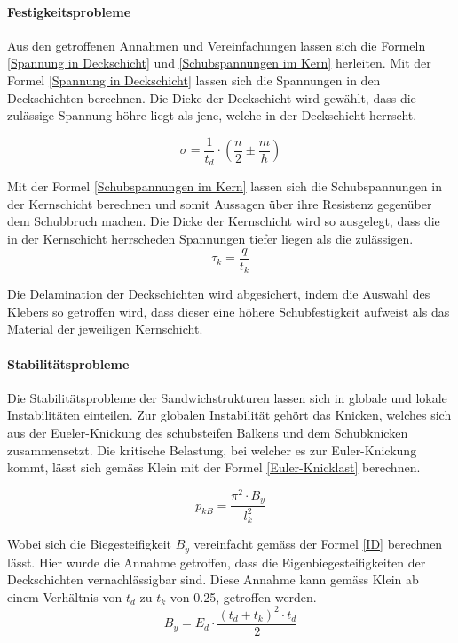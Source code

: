     \paragraph{Festigkeitsprobleme}
    Aus den getroffenen Annahmen und Vereinfachungen lassen sich die Formeln \ref{Spannung in Deckschicht} und \ref{Schubspannungen im Kern} herleiten. Mit der Formel \ref{Spannung in Deckschicht} lassen sich die Spannungen in den Deckschichten berechnen. Die Dicke der Deckschicht wird gewählt, dass die zulässige Spannung höhre liegt als jene, welche in der Deckschicht herrscht.

    \begin{equation}
      \label{Spannung in Deckschicht}
      \sigma = \frac{1}{t_d}\cdot \left ( \frac{n}{2} \pm \frac{m}{h}\right )
    \end{equation}

    Mit der Formel \ref{Schubspannungen im Kern} lassen sich die Schubspannungen in der Kernschicht berechnen und somit Aussagen über ihre Resistenz gegenüber dem Schubbruch machen. Die Dicke der Kernschicht wird so ausgelegt, dass die in der Kernschicht herrscheden Spannungen tiefer liegen als die zulässigen.
    \begin{equation}
      \label{Schubspannungen im Kern}
      \tau_k = \frac{q}{t_k}
    \end{equation}

    Die Delamination der Deckschichten wird abgesichert, indem die Auswahl des Klebers so getroffen wird, dass dieser eine höhere Schubfestigkeit aufweist als das Material der jeweiligen Kernschicht.

    \paragraph{Stabilitätsprobleme}
    Die Stabilitätsprobleme der Sandwichstrukturen lassen sich in globale und lokale Instabilitäten einteilen. Zur globalen Instabilität gehört das Knicken, welches sich aus der Eueler-Knickung des schubsteifen Balkens und dem Schubknicken zusammensetzt. Die kritische Belastung, bei welcher es zur Euler-Knickung kommt, lässt sich gemäss Klein \cite{klein} mit der Formel \ref{Euler-Knicklast} berechnen.

    \begin{equation}
      \label{Euler-Knicklast}
      p_{kB}=\frac{\pi^2 \cdot B_y}{l_k^2}
    \end{equation}

    Wobei sich die Biegesteifigkeit $B_y$ vereinfacht gemäss der Formel \ref{ID} berechnen lässt. Hier wurde die Annahme getroffen, dass die Eigenbiegesteifigkeiten der Deckschichten vernachlässigbar sind. Diese Annahme kann gemäss Klein \cite{klein} ab einem Verhältnis von $t_d$ zu $t_k$ von 0.25, getroffen werden.
    \begin{equation}
      \label{ID}
      B_y = E_d \cdot \frac{\left (t_d + t_k \right )^{2}\cdot t_d}{2}
    \end{equation}

